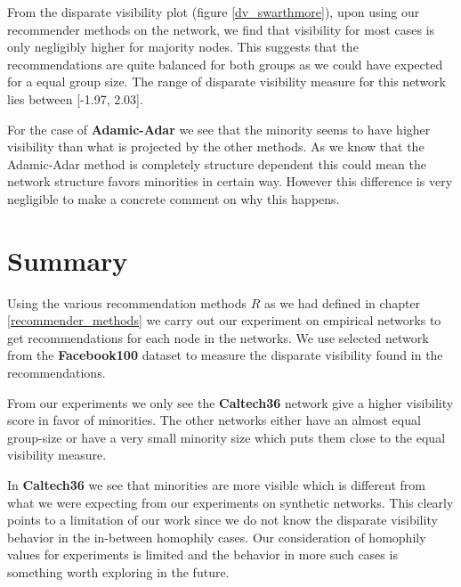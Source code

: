 From the disparate visibility plot (figure \ref{dv_swarthmore}), upon using our recommender methods on the network, we find that visibility for most cases is only negligibly higher for majority nodes. This suggests that the recommendations are quite balanced for both groups as we could have expected for a equal group size. The range of disparate visibility measure for this network lies between [-1.97, 2.03]. 

For the case of \textbf{Adamic-Adar} we see that the minority seems to have higher visibility than what is projected by the other methods. As we know that the Adamic-Adar method is completely structure dependent this could mean the network structure favors minorities in certain way. However this difference is very negligible to make a concrete comment on why this happens.

\section{Summary}

Using the various recommendation methods $R$ as we had defined in chapter \ref{recommender_methods} we carry out our experiment on empirical networks to get recommendations for each node in the networks. We use selected network from the \textbf{Facebook100} dataset to measure the disparate visibility found in the recommendations.

From our experiments we only see the \textbf{Caltech36} network give a higher visibility score in favor of minorities. The other networks either have an almost equal group-size or have a very small minority size which puts them close to the equal visibility measure.

In \textbf{Caltech36} we see that minorities are more visible which is different from what we were expecting from our experiments on synthetic networks. This clearly points to a limitation of our work since we do not know the disparate visibility behavior in the in-between homophily cases. Our consideration of homophily values for experiments is limited and the behavior in more such cases is something worth exploring in the future.